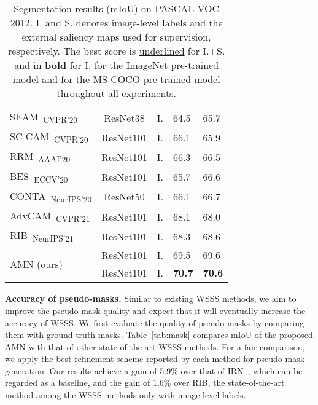 \documentclass[10pt,twocolumn,letterpaper]{article}
\begin{document}
\begin{table}[]
{\begin{tabular}{@{}lccll@{}}
\multicolumn{1}{l}{SEAM~\cite{wang2020self}\textsubscript{CVPR'20}}                     & ResNet38  & I.    & 64.5                    & 65.7                     \\ 
\multicolumn{1}{l}{SC-CAM~\cite{chang2020weakly}\textsubscript{CVPR'20}}                & ResNet101  & I.    & 66.1                    & 65.9                     \\
\multicolumn{1}{l}{RRM~\cite{zhang2020reliability}\textsubscript{AAAI'20}}              & ResNet101  & I.    & 66.3                    & 66.5                     \\
\multicolumn{1}{l}{BES~\cite{chen2020boundary}\textsubscript{ECCV'20}}                  & ResNet101  & I.    & 65.7                    & 66.6                     \\
\multicolumn{1}{l}{CONTA~\cite{zhang2020causal}\textsubscript{NeurIPS'20}}              & ResNet50  & I.    & 66.1                    & 66.7                     \\
\multicolumn{1}{l}{AdvCAM~\cite{lee2021anti}\textsubscript{CVPR'21}}                    & ResNet101  & I.    & 68.1                    & 68.0                     \\
\multicolumn{1}{l}{RIB~\cite{lee2021reducing}\textsubscript{NeurIPS'21}}                    & ResNet101  & I.    & 68.3                    & 68.6                     \\ \midrule
\multicolumn{1}{l}{\multirow{2}{*}{AMN (ours)}}                                               & ResNet101  & I.    & 69.5                    & 69.6            \\
\multicolumn{1}{l}{}                                                                    & ResNet101  & I.    & \textbf{70.7}                    & \textbf{70.6}                     \\ \bottomrule
\end{tabular}
}
\vspace{-2mm}
\caption{Segmentation results (mIoU) on PASCAL VOC 2012. I. and S. denotes image-level labels and the external saliency maps used for supervision, respectively. The best score is \underline{underlined} for I.+S. and in \textbf{bold} for I.  for the ImageNet pre-trained model and  for the MS COCO pre-trained model throughout all experiments.}
\label{tab:seg_voc}
\vspace{-5mm}
\end{table} 
\noindent\textbf{Accuracy of pseudo-masks.} Similar to existing WSSS methods, we aim to improve the pseudo-mask quality and expect that it will eventually increase the accuracy of WSSS. We first evaluate the quality of pseudo-masks by comparing them with ground-truth masks. Table~\ref{tab:mask} compares mIoU of the proposed AMN with that of other state-of-the-art WSSS methods. For a fair comparison, we apply the best refinement scheme reported by each method for pseudo-mask generation. Our results achieve a gain of 5.9\% over that of IRN~\cite{ahn2019weakly}, which can be regarded as a baseline, and the gain of 1.6\% over RIB, the state-of-the-art method among the WSSS methods only with image-level labels. 
\end{document}
